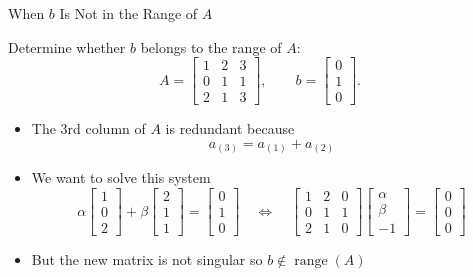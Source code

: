 \documentclass[10pt]{beamer}
\begin{document}
\begin{frame}{When $b$ Is Not in the Range of $A$}

\begin{example}
Determine whether $b$ belongs to the range of $A$:
\[
A=
\begin{bmatrix}
    1&2&3\\
    0&1&1\\
    2&1&3
\end{bmatrix},
\qquad
b=
\begin{bmatrix}
    0\\1\\0
\end{bmatrix}.
\]
\end{example}

\begin{itemize}
    \item The 3rd column of $A$ is redundant because
    $$
        a_{(3)} = a_{(1)} + a_{(2)}
    $$
    \item We want to solve this system 
    \[
        \alpha\begin{bmatrix}1\\0\\2\end{bmatrix}
        +\beta\begin{bmatrix}2\\1\\1\end{bmatrix}
        =
        \begin{bmatrix}0\\1\\0\end{bmatrix}
\quad \Leftrightarrow \quad 
\begin{bmatrix}
    1&2&0\\
    0&1&1\\
    2&1&0
\end{bmatrix}
\begin{bmatrix}
    \alpha \\\beta\\-1
\end{bmatrix}=
\begin{bmatrix}
    0\\0\\0
\end{bmatrix}
\]
    \item But the new matrix is not singular so     $b\notin\operatorname{range}(A)$
\end{itemize}

\end{frame}
\end{document}
